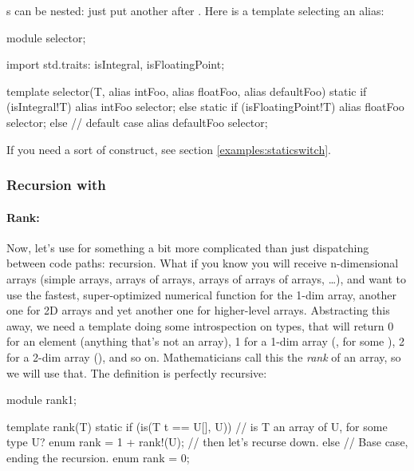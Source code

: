 s can be nested: just put another  after . Here is a template selecting an alias:

\begin{dcode}
module selector;

import std.traits: isIntegral, isFloatingPoint;

template selector(T, alias intFoo, alias floatFoo, alias defaultFoo)
{
    static if (isIntegral!T)
       alias intFoo selector;
    else static if (isFloatingPoint!T)
       alias floatFoo selector; 
    else // default case
        alias defaultFoo selector;
}
\end{dcode}

If you need a sort of  construct, see section \ref{examples:staticswitch}.

\subsubsection{\texorpdfstring{Recursion with }
                              {Recursion with static if}}
\label{staticifrecursion}

\paragraph{Rank:}\label{rank}

Now, let's use  for something a bit more complicated than just dispatching between code paths: recursion.  What if you know you will receive n-dimensional arrays (simple arrays, arrays of arrays, arrays of arrays of arrays, \ldots), and want to use the fastest, super-optimized numerical function for the 1-dim array, another one for 2D arrays and yet another one for higher-level arrays. Abstracting this away, we need a template doing some introspection on types, that will return 0 for an element (anything that's not an array), 1 for a 1-dim array (, for some ), 2 for a 2-dim array (), and so on. Mathematicians call this the \emph{rank} of an array, so we will use that. The definition is perfectly recursive: 
\begin{ndcode}
module rank1;

template rank(T)
{
    static if (is(T t == U[], U)) // is T an array of U, for some type U?
        enum rank = 1 + rank!(U); // then let's recurse down.
    else                          // Base case, ending the recursion.
        enum rank = 0; 
}
\end{ndcode}


